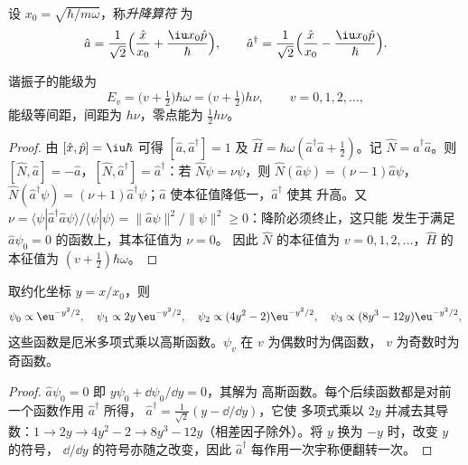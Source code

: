 \begin{definition}[升降算符]\label{def:b3:quantum-model-systems:ladder}
设 $x_0 = \sqrt{\hbar/m\omega}$，称\emph{升降算符}
为
\[
\hat a = \frac{1}{\sqrt2}\Big(\frac{\hat x}{x_0} + \frac{\iu x_0\hat p}{\hbar}\Big),
\qquad \hat a^\dagger = \frac{1}{\sqrt2}\Big(\frac{\hat x}{x_0} -
\frac{\iu x_0\hat p}{\hbar}\Big).
\]
\end{definition}

\begin{theorem}[谐振子的能级]\label{thm:b3:quantum-model-systems:oscillator}
谐振子的能级为
\[
E_v = \big(v + \tfrac12\big)\hbar\omega = \big(v + \tfrac12\big)h\nu, \qquad v =
0, 1, 2, \dots,
\]
能级等间距，间距为 $h\nu$，零点能为 $\frac12h\nu$。
\end{theorem}

\begin{proof}
由 $[\hat x,\hat p] = \iu\hbar$ 可得 $[\hat a,\hat a^\dagger] = 1$ 及
$\hat H = \hbar\omega(\hat a^\dagger\hat a + \frac12)$。记 $\hat N =
\hat a^\dagger\hat a$。则 $[\hat N,\hat a] = -\hat a$，$[\hat N,\hat
a^\dagger] = \hat a^\dagger$：若 $\hat N\psi = \nu\psi$，则 $\hat N(\hat
a\psi) = (\nu - 1)\hat a\psi$，$\hat N(\hat a^\dagger\psi) = (\nu + 1)\hat
a^\dagger\psi$；$\hat a$ 使本征值降低一，$\hat a^\dagger$ 使其
升高。又 $\nu = \langle\psi|\hat a^\dagger\hat a\psi\rangle/\langle\psi|\psi
\rangle = \|\hat a\psi\|^2/\|\psi\|^2 \ge 0$：降阶必须终止，这只能
发生于满足 $\hat a\psi_0 = 0$ 的函数上，其本征值为 $\nu = 0$。
因此 $\hat N$ 的本征值为 $v = 0, 1, 2, \dots$，$\hat H$ 的本征值为
$(v + \frac12)\hbar\omega$。
\end{proof}

\begin{proposition}[最初几个波函数]\label{prop:b3:quantum-model-systems:oscillator-functions}
取约化坐标 $y = x/x_0$，则
\[
\psi_0 \propto \eu^{-y^2/2}, \quad \psi_1 \propto 2y\,\eu^{-y^2/2}, \quad
\psi_2 \propto (4y^2 - 2)\eu^{-y^2/2}, \quad \psi_3 \propto (8y^3 -
12y)\eu^{-y^2/2},
\]
这些函数是厄米多项式乘以高斯函数。$\psi_v$ 在 $v$ 为偶数时为偶函数，
$v$ 为奇数时为奇函数。
\end{proposition}

\begin{proof}
$\hat a\psi_0 = 0$ 即 $y\psi_0 + \dd\psi_0/\dd y = 0$，其解为
高斯函数。每个后续函数都是对前一个函数作用 $\hat a^\dagger$ 所得，
$\hat a^\dagger = \frac{1}{\sqrt2}(y - \dd/\dd y)$，它使
多项式乘以 $2y$ 并减去其导数：$1 \to 2y \to 4y^2 - 2 \to
8y^3 - 12y$（相差因子除外）。将 $y$ 换为 $-y$ 时，改变 $y$ 的符号，
$\dd/\dd y$ 的符号亦随之改变，因此 $\hat a^\dagger$ 每作用一次宇称便翻转一次。
\end{proof}

